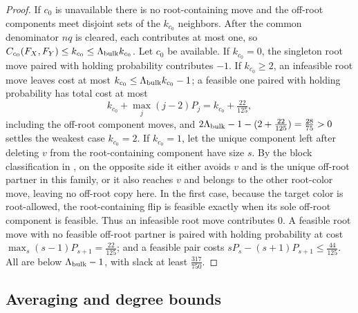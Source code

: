 \begin{proof}
If $c_0$ is unavailable there is no root-containing move and the off-root
components meet disjoint sets of the \(k_{c_0}\) neighbors.  After the
common denominator \(nq\) is cleared, each contributes at most one, so
\(C_{c_0}(F_X,F_Y)\le k_{c_0}\le\Lambda_{\rm bulk}k_{c_0}\). Let \(c_0\) be
available. If \(k_{c_0}=0\), the singleton root move paired with holding
probability contributes \(-1\). If \(k_{c_0}\ge2\), an infeasible root move leaves
cost at most \(k_{c_0}\le\Lambda_{\rm bulk}k_{c_0}-1\); a feasible one paired with
holding probability has total cost at most
\[
  k_{c_0}+\max_j(j-2)P_j=k_{c_0}+\tfrac{22}{125},
\]
including the off-root component moves, and
$2\Lambda_{\rm bulk}-1-(2+\tfrac{22}{125})
=\tfrac{28}{75}>0$ settles the weakest case \(k_{c_0}=2\). If \(k_{c_0}=1\), let the unique
component left after deleting $v$ from the root-containing component have
size $s$.  By the block classification in
, on the opposite side it either avoids \(v\)
and is the unique off-root partner in this family, or it also reaches \(v\)
and belongs to the other root-color move, leaving no off-root copy here.
In the first case, because the target color is root-allowed, the
root-containing flip is feasible exactly when its sole off-root component
is feasible.  Thus an infeasible root move contributes $0$. A feasible root move with no
feasible off-root partner is paired with holding probability at cost
$\max_s(s-1)P_{s+1}=\tfrac{22}{125}$; and a feasible pair costs
$sP_s-(s+1)P_{s+1}\le\tfrac{44}{125}$. All are below
$\Lambda_{\rm bulk}-1$, with slack at least $\tfrac{317}{750}$.
\end{proof}

\subsection{Averaging and degree bounds}

